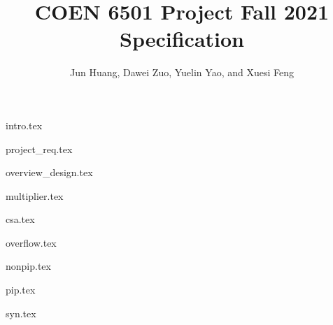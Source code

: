 \documentclass[stu, floatsintext, 12pt, a4paper, donotrepeattitle, natbib]{apa7}
\title{COEN 6501 Project Fall 2021 Specification}
\author{Jun Huang, Dawei Zuo, Yuelin Yao, and Xuesi Feng}
\begin{document}
\maketitle

\renewcommand\contentsname{Table of Conetnts}
\tableofcontents
\setcounter{tocdepth}{5}

\newpage
\renewcommand{\listfigurename}{List of Figures}
\listoffigures
\newpage
\renewcommand{\listtablename}{List of Tables}
\listoftables


\newpage
{intro.tex}

\newpage
{project_req.tex}

\newpage
{overview_design.tex}

\newpage
{multiplier.tex}

\newpage
{csa.tex}

\newpage
{overflow.tex}

\newpage
{nonpip.tex}

\newpage
{pip.tex}

\newpage
{syn.tex}

\newpage
\renewcommand\refname{\textbf{References}}

\end{document}
